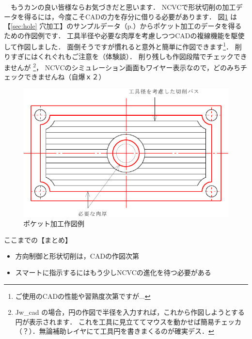 　もうカンの良い皆様ならお気づきだと思います．
NCVCで形状切削の加工データを得るには，今度こそCADの力を存分に借りる必要があります．
図\ref{fig:keijyou.pdf} は【\ref{sec:hole} 穴加工】のサンプルデータ（p.\pageref{fig:sample2.pdf}）からポケット加工のデータを得るための作図例です．
工具半径や必要な肉厚を考慮しつつCADの複線機能を駆使して作図しました．
面倒そうですが慣れると意外と簡単に作図できます\footnote{ご使用のCADの性能や習熟度次第ですが...}．
削りすぎにはくれぐれもご注意を（体験談）．
削り残しも作図段階でチェックできませんが
\footnote{Jw\_cad の場合，円の作図で半径を入力すれば，これから作図しようとする円が表示されます．
これを工具に見立ててマウスを動かせば簡易チェッカ（？）．無論補助レイヤにて工具円を書きまくるのが確実デス．}，
NCVCのシミュレーション画面もワイヤー表示なので，どのみちチェックできませんね（自爆ｘ２）

\begin{figure}[H]
\centering
\includegraphics{No4/fig/keijyou-crop.pdf}
\caption{ポケット加工作図例}
\label{fig:keijyou.pdf}
\end{figure}

\vspace*{2zh}
\begin{itembox}[l]{ここまでの【まとめ】}
\begin{itemize}
\item 方向制御と形状切削は，CADの作図次第
\item スマートに指示するにはもう少しNCVCの進化を待つ必要がある
\end{itemize}
\end{itembox}
